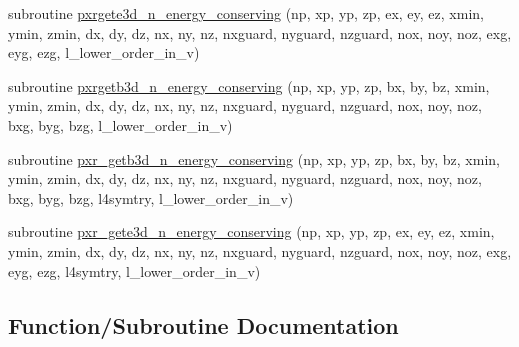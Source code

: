 \begin{DoxyCompactItemize}
subroutine \hyperlink{field__gathering_8_f90_aff764c0eb8ae48e31d7bb6f39467cabf}{pxrgete3d\+\_\+n\+\_\+energy\+\_\+conserving} (np, xp, yp, zp, ex, ey, ez, xmin, ymin, zmin,                                                                                                                                                                           dx, dy, dz, nx, ny, nz, nxguard, nyguard, nzguard,                                                                                                                                                   nox, noy, noz, exg, eyg, ezg, l\+\_\+lower\+\_\+order\+\_\+in\+\_\+v)
\item 
subroutine \hyperlink{field__gathering_8_f90_aa51d5771b10a0ee5f74ceda73388778e}{pxrgetb3d\+\_\+n\+\_\+energy\+\_\+conserving} (np, xp, yp, zp, bx, by, bz, xmin, ymin, zmin,                                                                                                                                                               dx, dy, dz, nx, ny, nz, nxguard, nyguard, nzguard,                                                                                                                                                   nox, noy, noz, bxg, byg, bzg, l\+\_\+lower\+\_\+order\+\_\+in\+\_\+v)
\item 
subroutine \hyperlink{field__gathering_8_f90_a3d18b5a2fca069b67c4e49c7d1559dd8}{pxr\+\_\+getb3d\+\_\+n\+\_\+energy\+\_\+conserving} (np, xp, yp, zp, bx, by, bz, xmin, ymin, zmin, dx, dy, dz, nx, ny, nz, nxguard, nyguard, nzguard,                                                                                                                                                       nox, noy, noz, bxg, byg, bzg, l4symtry, l\+\_\+lower\+\_\+order\+\_\+in\+\_\+v)
\item 
subroutine \hyperlink{field__gathering_8_f90_af8a29b924d0086de0d933851a07b5f32}{pxr\+\_\+gete3d\+\_\+n\+\_\+energy\+\_\+conserving} (np, xp, yp, zp, ex, ey, ez, xmin, ymin, zmin, dx, dy, dz, nx, ny, nz, nxguard, nyguard, nzguard,                                                                                                                                                       nox, noy, noz, exg, eyg, ezg, l4symtry, l\+\_\+lower\+\_\+order\+\_\+in\+\_\+v)
\end{DoxyCompactItemize}


\subsection{Function/\+Subroutine Documentation}
